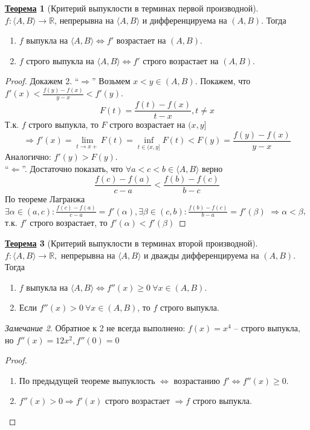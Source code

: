 \documentclass[12pt]{article}
\newenvironment{MyList}[1][4pt]{
  \begin{enumerate}[1.]
  \setlength{\parskip}{0pt}
  \setlength{\itemsep}{#1}
}{       
  \end{enumerate}
}
\def\R{\mathbb{R}}       %
\def\SO{\Rightarrow}     %
\def\EQ{\Leftrightarrow} %
\theoremstyle{definition} %
\newtheorem{Thm}{\underline{Теорема}}[subsection] %
\theoremstyle{plain} %
\theoremstyle{remark} %
\newtheorem{Rem}[Thm]{Замечание} %
\begin{document}
\begin{Thm}[Критерий выпуклости в терминах первой производной]
    $f : \langle A, B\rangle \to \R$, непрерывна на $\langle A, B\rangle$ и дифференцируема на $(A, B)$. Тогда
    \begin{MyList}
        \item $f$ выпукла на $\langle A, B\rangle \EQ f'$ возрастает на $(A, B)$.
        \item $f$ строго выпукла на $\langle A, B\rangle \EQ f'$ строго возрастает на $(A, B)$.    
    \end{MyList} 
\end{Thm}

\begin{proof}
    Докажем 2. ``$\SO$'' 
    Возьмем $x < y \in (A, B)$. Покажем, что $f'(x) < \frac{f(y) - f(x)}{y - x} < f'(y)$.
    \[F(t) = \frac{f(t) - f(x)}{t - x}, t \neq x\]
    Т.к. $f$ строго выпукла, то $F$ строго возрастает на $(x, y]$
    \[\SO f'(x) = \lim_{t \to x+} F(t) = \inf_{t \in (x, y]} F(t) < F(y) = \frac{f(y) - f(x)}{y - x}\]
    Аналогично: $f'(y) > F(y)$. \\
    ``$\Leftarrow$''. Достаточно показать, что $\forall a < c < b \in \langle A, B\rangle$ верно
    \[ \frac{f(c) - f(a)}{c - a} < \frac{f(b) - f(c)}{b - c}\]
    По теореме Лагранжа $\exists \alpha \in (a, c) : \frac{f(c) - f(a)}{c - a} = f'(\alpha), \exists \beta \in (c, b) : \frac{f(b) - f(c)}{b - a} = f'(\beta)$
    $\SO \alpha < \beta$, т.к. $f'$ строго возрастает, то $f'(\alpha) < f'(\beta)$ 
\end{proof}

\begin{Thm}[Критерий выпуклости в терминах второй производной]
    $f : \langle A, B\rangle \to \R, $ непрерывна на $\langle A, B\rangle$ и дважды дифференцируема на $(A, B)$.
    Тогда
    \begin{MyList}
        \item $f$ выпукла на $\langle A, B\rangle \EQ f''(x) \geqslant 0 \ \forall x \in (A, B)$.
        \item Если $f''(x) > 0 \ \forall x \in (A, B)$, то $f$ строго выпукла.
    \end{MyList}

    \begin{Rem}
        Обратное к 2 не всегда выполнено: $f(x) = x^4$ -- строго выпукла, но $f''(x) = 12x^2, f''(0) = 0$ 
    \end{Rem}
\end{Thm}

\begin{proof}
    \begin{MyList}
        \item По предыдущей теореме выпуклость $\EQ$ возрастанию $f' \EQ f''(x) \geqslant 0$.
        
        \item $f''(x) > 0 \SO f'(x)$ строго возрастает $\SO f$ строго выпукла. 
    \end{MyList}
\end{proof}
\end{document}
